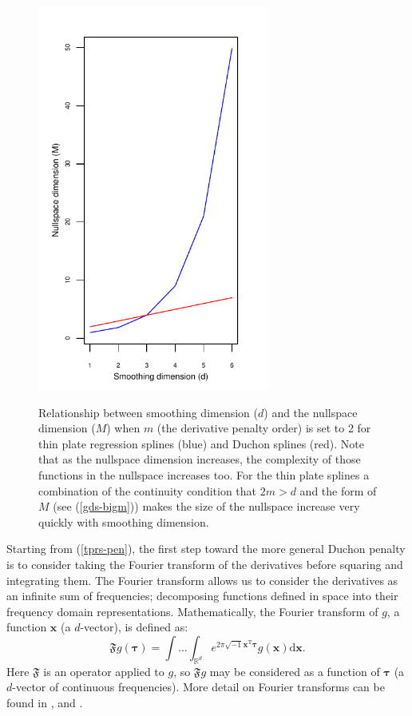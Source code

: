 \begin{figure}
\centering
\includegraphics[width=3in]{gds/figs/nullspace-dim.pdf} \\
\caption{Relationship between smoothing dimension ($d$) and the nullspace dimension ($M$) when $m$ (the derivative penalty order) is set to 2 for thin plate regression splines (blue) and Duchon splines (red). Note that as the nullspace dimension increases, the complexity of those functions in the nullspace increases too. For the thin plate splines a combination of the continuity condition that $2m>d$ and the form of $M$ (see (\ref{gds-bigm})) makes the size of the nullspace increase very quickly with smoothing dimension.}
\label{nullspace-dim}
\end{figure}

Starting from (\ref{tprs-pen}), the first step toward the more general Duchon penalty is to consider taking the Fourier transform of the derivatives before squaring and integrating them. The Fourier transform allows us to consider the derivatives as an infinite sum of frequencies; decomposing functions defined in space into their frequency domain representations. Mathematically, the Fourier transform of $g$, a function $\mathbf{x}$ (a $d$-vector), is defined as:
\begin{equation*}
\mathfrak{F} g(\boldsymbol{\tau}) = \int \ldots \int_{\mathbb{R}^d} e^{2 \pi \sqrt{-1} \mathbf{x}^\text{T} \boldsymbol{\tau}} g(\mathbf{x}) \text{d}\mathbf{x}.
\end{equation*}
Here $\mathfrak{F}$ is an operator applied to $g$, so $\mathfrak{F}g$ may be considered as a function of $\boldsymbol{\tau}$ (a $d$-vector of continuous frequencies). More detail on Fourier transforms can be found in ,  and . 

